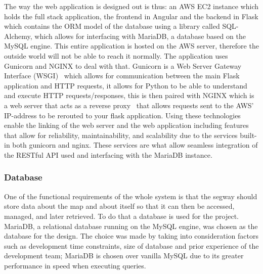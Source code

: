 The way the web application is designed out is thus: an AWS EC2 instance which holds the full stack application, the frontend in Angular and the backend in Flask which contains the ORM model of the database using a library called SQL-Alchemy, which allows for interfacing with MariaDB, a database based on the MySQL engine. This entire application is hosted on the AWS server, therefore the outside world will not be able to reach it normally. The application uses Gunicorn and NGINX to deal with that. Gunicorn is a Web Server Gateway Interface (WSGI)~\cite{ref:gunicorn} which allows for communication between the main Flask application and HTTP requests, it allows for Python to be able to understand and execute HTTP requests/responses, this is then paired with NGINX which is a web server that acts as a reverse proxy~\cite{ref:nginx} that allows requests sent to the AWS’ IP-address to be rerouted to your flask application. Using these technologies enable the linking of the web server and the web application including features that allow for reliability, maintainability, and scalability due to the services built-in both gunicorn and nginx. These services are what allow seamless integration of the RESTful API used and interfacing with the MariaDB instance.

\subsubsection*{Database}
One of the functional requirements of the whole system is that the segway should store data about the map and about itself so that it can then be accessed, managed, and later retrieved. To do that a database is used for the project. MariaDB, a relational database running on the MySQL engine, was chosen as the database for the design. The choice was made by taking into consideration factors such as development time constraints, size of database and prior experience of the development team; MariaDB is chosen over vanilla MySQL due to its greater performance in speed when executing queries. 

